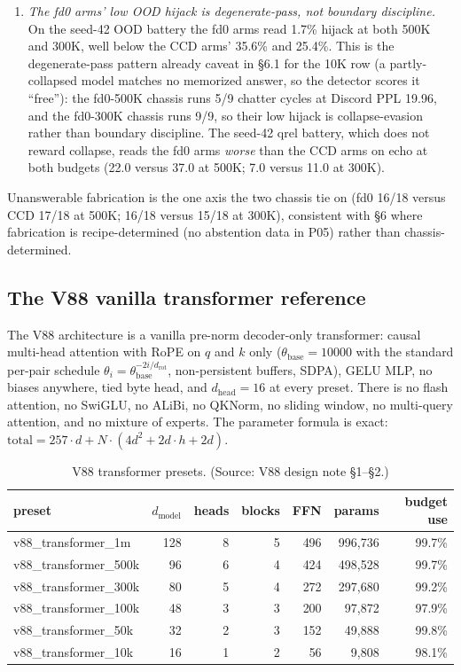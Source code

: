 \documentclass[11pt]{article}
\begin{document}
\begin{enumerate}
\item \emph{The fd0 arms' low OOD hijack is degenerate-pass, not boundary discipline.} On the seed-42 OOD battery the fd0 arms read 1.7\% hijack at both 500K and 300K, well below the CCD arms' 35.6\% and 25.4\%. This is the degenerate-pass pattern already caveat in \S6.1 for the 10K row (a partly-collapsed model matches no memorized answer, so the detector scores it ``free''): the fd0-500K chassis runs 5/9 chatter cycles at Discord PPL 19.96, and the fd0-300K chassis runs 9/9, so their low hijack is collapse-evasion rather than boundary discipline. The seed-42 qrel battery, which does not reward collapse, reads the fd0 arms \emph{worse} than the CCD arms on echo at both budgets (22.0 versus 37.0 at 500K; 7.0 versus 11.0 at 300K).
\end{enumerate}

Unanswerable fabrication is the one axis the two chassis tie on (fd0 16/18 versus CCD 17/18 at 500K; 16/18 versus 15/18 at 300K), consistent with \S6 where fabrication is recipe-determined (no abstention data in P05) rather than chassis-determined.

\subsection{The V88 vanilla transformer reference}

The V88 architecture is a vanilla pre-norm decoder-only transformer: causal multi-head attention with RoPE on $q$ and $k$ only ($\theta_{\text{base}} = 10000$ with the standard per-pair schedule $\theta_i = \theta_{\text{base}}^{-2i/d_{\text{rot}}}$, non-persistent buffers, SDPA), GELU MLP, no biases anywhere, tied byte head, and $d_{\text{head}} = 16$ at every preset. There is no flash attention, no SwiGLU, no ALiBi, no QKNorm, no sliding window, no multi-query attention, and no mixture of experts. The parameter formula is exact: $\text{total} = 257 \cdot d + N \cdot (4 d^2 + 2 d \cdot h + 2 d)$.

\begin{table}[!t]
\small
\caption{V88 transformer presets. (Source: V88 design note \S1--\S2.)}
\label{tab:v88-presets}
\centering
\begin{tabular}{lrrrrrr}
\toprule
preset & $d_{\text{model}}$ & heads & blocks & FFN & params & budget use \\
\midrule
v88\_transformer\_1m  & 128 & 8 & 5 & 496 & 996,736 & 99.7\% \\
v88\_transformer\_500k&  96 & 6 & 4 & 424 & 498,528 & 99.7\% \\
v88\_transformer\_300k&  80 & 5 & 4 & 272 & 297,680 & 99.2\% \\
v88\_transformer\_100k&  48 & 3 & 3 & 200 &  97,872 & 97.9\% \\
v88\_transformer\_50k &  32 & 2 & 3 & 152 &  49,888 & 99.8\% \\
v88\_transformer\_10k &  16 & 1 & 2 &  56 &   9,808 & 98.1\% \\
\bottomrule
\end{tabular}
\end{table}
\end{document}
